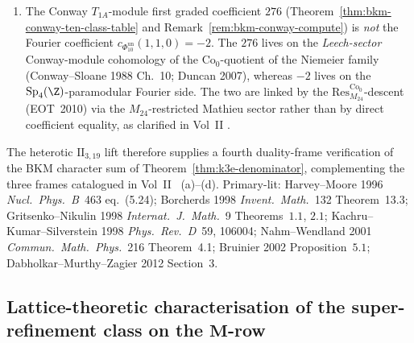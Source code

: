 \begin{remark}
\begin{enumerate}[label=\textup{(\roman*)}]
\textup{(}equivalently
$\mathrm{ord}_{\mathcal{H}_{-1}}\Delta_5 = 1$ on the $\mu_8$-banded
square-root locus\textup{)}.
\item The Conway $T_{1A}$-module first graded coefficient $276$
\textup{(}Theorem~\ref{thm:bkm-conway-ten-class-table} and
Remark~\ref{rem:bkm-conway-compute}\textup{)} is \emph{not}
the Fourier coefficient \(c_{\Phi_{10}^{\mathrm{un}}}(1, 1, 0) = -2\). The $276$
lives on the \emph{Leech-sector} Conway-module cohomology of the
$\mathrm{Co}_0$-quotient of the Niemeier family
\textup{(}Conway--Sloane 1988 Ch.~10; Duncan 2007\textup{)},
whereas $-2$ lives on the $\mathrm{Sp}_4(\Z)$-paramodular Fourier
side. The two are linked by the
$\mathrm{Res}^{\mathrm{Co}_0}_{M_{24}}$-descent
\textup{(}EOT~2010\textup{)} via the $M_{24}$-restricted Mathieu
sector rather than by direct coefficient equality, as clarified in
Vol~II \cite{VolII}.
\end{enumerate}
The heterotic $\mathrm{II}_{3,19}$ lift therefore supplies a fourth
duality-frame verification of the BKM character sum of
Theorem~\ref{thm:k3e-denominator}, complementing the three frames
catalogued in Vol~II
\cite{VolII}~\textup{(a)}--\textup{(d)}.
Primary-lit: Harvey--Moore 1996 \emph{Nucl.~Phys.~B}~463 eq.~(5.24);
Borcherds 1998 \emph{Invent.~Math.}~132 Theorem~13.3;
Gritsenko--Nikulin 1998 \emph{Internat.~J.~Math.}~9 Theorems~$1.1$, $2.1$;
Kachru--Kumar--Silverstein 1998 \emph{Phys.~Rev.~D}~59, 106004;
Nahm--Wendland 2001 \emph{Commun.~Math.~Phys.}~216 Theorem~4.1;
Bruinier 2002 Proposition~$5.1$;
Dabholkar--Murthy--Zagier 2012 Section~3.
\end{remark}

\subsection{Lattice-theoretic characterisation of the super-refinement
class on the \texorpdfstring{$\mathbf{M}$}{M}-row}
\label{subsec:bkm-super-refinement-lattice-characterisation}

